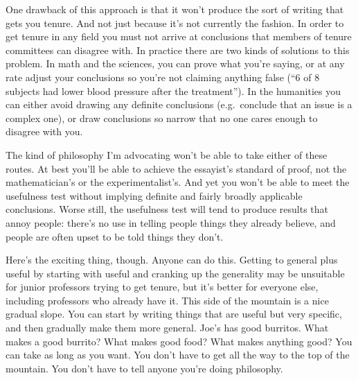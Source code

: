 One drawback of this approach is that it won't produce the sort of
writing that gets you tenure. And not just because it's not currently
the fashion. In order to get tenure in any field you must not arrive at
conclusions that members of tenure committees can disagree with. In
practice there are two kinds of solutions to this problem. In math and
the sciences, you can prove what you're saying, or at any rate adjust
your conclusions so you're not claiming anything false (``6 of 8
subjects had lower blood pressure after the treatment''). In the
humanities you can either avoid drawing any definite conclusions
(e.g.~conclude that an issue is a complex one), or draw conclusions so
narrow that no one cares enough to disagree with you.

The kind of philosophy I'm advocating won't be able to take either of
these routes. At best you'll be able to achieve the essayist's standard
of proof, not the mathematician's or the experimentalist's. And yet you
won't be able to meet the usefulness test without implying definite and
fairly broadly applicable conclusions. Worse still, the usefulness test
will tend to produce results that annoy people: there's no use in
telling people things they already believe, and people are often upset
to be told things they don't.

Here's the exciting thing, though. Anyone can do this. Getting to
general plus useful by starting with useful and cranking up the
generality may be unsuitable for junior professors trying to get tenure,
but it's better for everyone else, including professors who already have
it. This side of the mountain is a nice gradual slope. You can start by
writing things that are useful but very specific, and then gradually
make them more general. Joe's has good burritos. What makes a good
burrito? What makes good food? What makes anything good? You can take as
long as you want. You don't have to get all the way to the top of the
mountain. You don't have to tell anyone you're doing philosophy.


